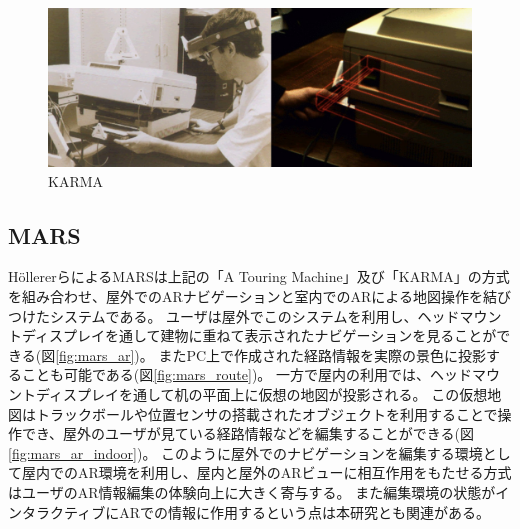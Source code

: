 \begin{figure}[H]
  \centering
  \includegraphics[width=150mm]{images/karma.jpg}
  \caption{KARMA} \label{fig:karma}
\end{figure}


\subsection{MARS}
HöllererらによるMARS\cite{MARS}は上記の「A Touring Machine」及び「KARMA」の方式を組み合わせ、屋外でのARナビゲーションと室内でのARによる地図操作を結びつけたシステムである。
ユーザは屋外でこのシステムを利用し、ヘッドマウントディスプレイを通して建物に重ねて表示されたナビゲーションを見ることができる(図\ref{fig:mars_ar})。
またPC上で作成された経路情報を実際の景色に投影することも可能である(図\ref{fig:mars_route})。
一方で屋内の利用では、ヘッドマウントディスプレイを通して机の平面上に仮想の地図が投影される。
この仮想地図はトラックボールや位置センサの搭載されたオブジェクトを利用することで操作でき、屋外のユーザが見ている経路情報などを編集することができる(図\ref{fig:mars_ar_indoor})。
このように屋外でのナビゲーションを編集する環境として屋内でのAR環境を利用し、屋内と屋外のARビューに相互作用をもたせる方式はユーザのAR情報編集の体験向上に大きく寄与する。
また編集環境の状態がインタラクティブにARでの情報に作用するという点は本研究とも関連がある。

